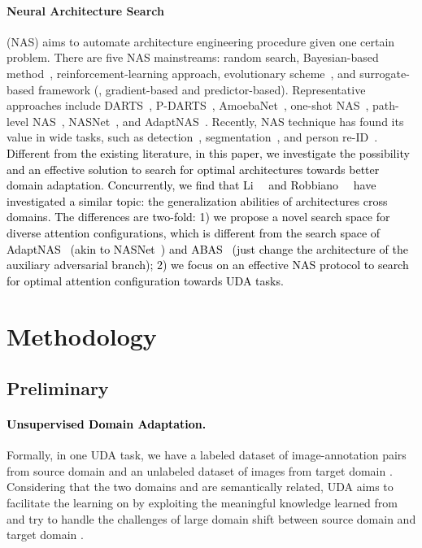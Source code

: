 \documentclass[10pt,twocolumn,letterpaper]{article}
\begin{document}
\paragraph{Neural Architecture Search} (NAS) aims to automate architecture engineering procedure given one certain problem.
There are five NAS mainstreams: random search, Bayesian-based method~\cite{falkner2018bohb}, reinforcement-learning approach, evolutionary scheme~\cite{back1996evolutionary}, and surrogate-based framework (, gradient-based and predictor-based).
Representative approaches include DARTS~\cite{liu2018DARTS}, P-DARTS~\cite{chen2019progressive}, AmoebaNet~\cite{real2019EvoNAS}, one-shot NAS~\cite{bender2018oneshotNAS,guo2020SPOS}, path-level NAS~\cite{cai2018PathLevelNAS}, NASNet~\cite{zoph2018NASNet}, and AdaptNAS~\cite{li2020adapting}.
Recently, NAS technique has found its value in wide tasks, such as detection~\cite{chen2019detnas}, segmentation~\cite{liu2019AutoDeepLab}, and person re-ID~\cite{quan2019AutoReID}.
\textcolor{black}{Different from the existing literature, in this paper, we investigate the possibility and an effective solution to search for optimal architectures towards better domain adaptation. Concurrently, we find that Li~\etal~\cite{li2020adapting} and Robbiano~\etal~\cite{robbiano2021adversarial} have investigated a similar topic: the generalization abilities of architectures cross domains.
The differences are two-fold: 1) we propose a novel search space for diverse attention configurations, which is different from the search space of AdaptNAS~\cite{li2020adapting} (akin to NASNet~\cite{zoph2018NASNet}) and ABAS~\cite{robbiano2021adversarial} (just change the architecture of the auxiliary adversarial branch); 2) we focus on an effective NAS protocol to search for optimal attention configuration towards UDA tasks.
}









%
 
\section{Methodology}
\subsection{Preliminary}
\paragraph{\textcolor{black}{Unsupervised Domain Adaptation.}}
Formally, in one UDA task, we have a labeled dataset  of  image-annotation pairs from source domain  and an unlabeled dataset  of  images from target domain .
Considering that the two domains  and  are semantically related, UDA aims to facilitate the learning on  by exploiting the meaningful knowledge learned from  and try to handle the challenges of large domain shift between source domain  and target domain .
\end{document}
